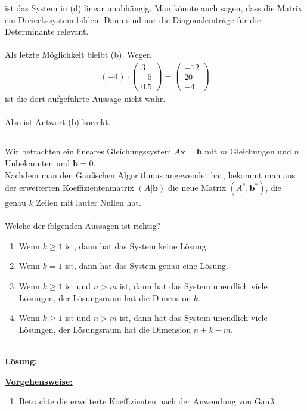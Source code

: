 ist das System in (d) linear unabhängig.
Man könnte auch sagen, dass die Matrix ein Dreieckssystem bilden. Dann sind nur die Diagonaleinträge für die Determinante relevant.\\
\\
Als letzte Möglichkeit bleibt (b).
Wegen 
\begin{align*}
(-4) \cdot
\begin{pmatrix}
3 \\ -5 \\ 0.5
\end{pmatrix}
=
\begin{pmatrix}
-12 \\ 20 \\ -4
\end{pmatrix}
\end{align*}
ist die dort aufgeführte Aussage nicht wahr.\\
\\
Also ist Antwort (b) korrekt.

\newpage
\subsection*{}
Wir betrachten ein lineares Gleichungssystem $ A \textbf{x} = \textbf{b} $ mit $ m $ Gleichungen und $ n $ Unbekannten und $ \textbf{b} = 0 $.\\
Nachdem man den Gaußschen Algorithmus angewendet hat, bekommt man aus der erweiterten Koeffizientenmatrix $ (A | \textbf{b}) $ die neue Matrix $ (A^\ast, \textbf{b}^\ast) $, die genau $ k $ Zeilen mit lauter Nullen hat.\\
\\
Welche der folgenden Aussagen ist richtig?
\renewcommand{\labelenumi}{(\alph{enumi})}
\begin{enumerate}
	\item 
	Wenn $ k \geq 1 $ ist, dann hat das System keine Lösung.
	\item
	Wenn $ k = 1 $ ist, dann hat das System genau eine Lösung.
	
	\item
	Wenn $ k \geq 1 $ ist und $ n > m  $ ist, dann hat das System unendlich viele Lösungen, der Lösungsraum hat die Dimension $ k $.
	\item
	Wenn $ k \geq 1 $ ist und $ n > m  $ ist, dann hat das System unendlich viele Lösungen, der Lösungsraum hat die Dimension $ n+k -m$.
	
\end{enumerate}
\ \\
\textbf{Lösung:}
\begin{mdframed}
	\underline{\textbf{Vorgehensweise:}}
	\renewcommand{\labelenumi}{\theenumi.}
	\begin{enumerate}
		\item Betrachte die erweiterte Koeffizienten nach der Anwendung von Gauß. 
	\end{enumerate}
\end{mdframed}

